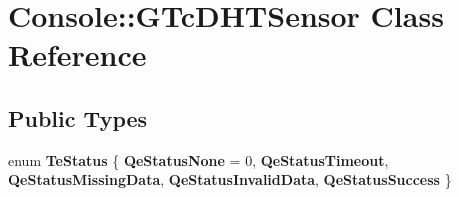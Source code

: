 \hypertarget{class_console_1_1_g_tc_d_h_t_sensor}{}\section{Console\+:\+:G\+Tc\+D\+H\+T\+Sensor Class Reference}
\label{class_console_1_1_g_tc_d_h_t_sensor}
\subsection*{Public Types}
\begin{DoxyCompactItemize}
\item 
\mbox{\label{class_console_1_1_g_tc_d_h_t_sensor_a773cdd4c7af39e023dbc893f07f6ad32}} 
enum {\bfseries Te\+Status} \{ \newline
{\bfseries Qe\+Status\+None} = 0, 
{\bfseries Qe\+Status\+Timeout}, 
{\bfseries Qe\+Status\+Missing\+Data}, 
{\bfseries Qe\+Status\+Invalid\+Data}, 
\newline
{\bfseries Qe\+Status\+Success}
 \}
\end{DoxyCompactItemize}
